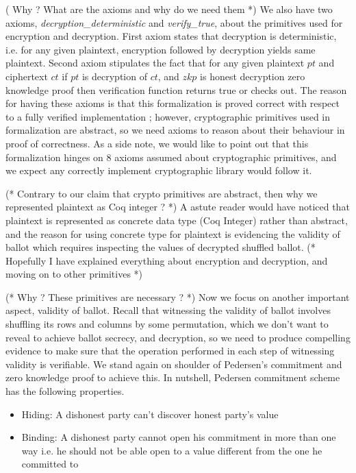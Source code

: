 \documentclass{llncs}
\begin{document}
( Why ? What are the axioms and why do we need them  *)
We also have two axioms,  \textit{decryption\_deterministic} and 
\textit{verify\_true}, about the primitives used for encryption and 
decryption. First axiom states that decryption is deterministic, i.e.
for any given plaintext, encryption followed by decryption yields same 
plaintext. Second axiom stipulates the fact that for any given plaintext 
$pt$ and ciphertext $ct$ if $pt$ is decryption of $ct$, and $zkp$ is 
honest decryption zero knowledge proof then verification function 
returns true or checks out. The reason for having these axioms is that this 
formalization is proved correct with 
respect to a fully verified implementation \cite{Pattinson:2017:SVE}; 
however, cryptographic primitives used in formalization  
are abstract, so we need axioms 
to reason about their behaviour in proof 
of correctness. As a side note, we would like to point out that
 this formalization hinges on 8 axioms assumed about cryptographic 
 primitives, and we expect any correctly implement cryptographic library 
 would follow it.

(* Contrary to our claim that crypto primitives are abstract, then 
why we represented plaintext as Coq integer ? *)
A astute reader would have noticed that plaintext is represented as 
concrete data type (Coq Integer) rather than abstract, and 
the reason for using concrete type for plaintext is evidencing the
validity of ballot which requires inspecting the values of 
decrypted shuffled ballot.
(* Hopefully I have explained everything about encryption and 
   decryption, and moving on to other primitives *)

(* Why ? These primitives are necessary ? *)
Now we focus on another important aspect, validity of 
ballot. Recall that witnessing 
the validity of ballot involves shuffling its rows and columns 
by some permutation, which
we don't want to reveal to achieve ballot secrecy, and decryption, so 
we need to produce compelling evidence 
to make sure that the operation performed in each step of witnessing validity 
is verifiable. We stand again on shoulder of Pedersen's 
commitment \cite{Pederson} and zero knowledge proof to achieve this.
In nutshell, Pedersen commitment scheme has 
the following properties. 
\begin{itemize}
\item Hiding: A dishonest party can't discover honest party's value 
\item Binding: A dishonest party cannot open his commitment in more  
	 	than one way i.e. he should not be able open to a value 
	 	different from the one he committed to 
\end{itemize}
\end{document}
